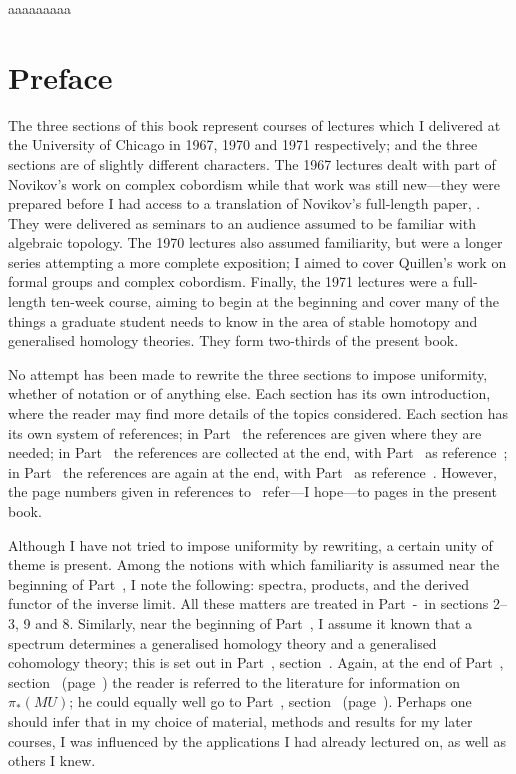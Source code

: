 \documentclass[main]{subfiles}
\begin{document}
 aaaaaaaaa

\chapter*{Preface}
The three sections of this book represent courses of lectures which I delivered at the University of Chicago in 1967, 1970 and 1971 respectively; and the three sections are of slightly different characters.
The 1967 lectures dealt with part of Novikov's work on complex cobordism while that work was still new---they were prepared before I had access to a translation of Novikov's full-length paper, . 
They were delivered as seminars to an audience assumed to be familiar with algebraic topology. 
The 1970 lectures also assumed familiarity, but were a longer series attempting a more complete exposition; I aimed to cover Quillen's work on formal groups and complex cobordism.
Finally, the 1971 lectures were a full-length ten-week course, aiming to begin at the beginning and cover many of the things a graduate student needs to know in the area of stable homotopy and generalised homology theories.
They form two-thirds of the present book.

No attempt has been made to rewrite the three sections to impose uniformity, whether of notation or of anything else. 
Each section has its own introduction, where the reader may find more details of the topics considered. 
Each section has its own system of references; in Part~ the
references are given where they are needed; in Part~ the references are collected at the end, with Part~ as reference~\plscite{[2]}; in Part~ the references are again at the end, with Part~ as reference~. 
However, the page numbers given in references to~\plscite{[2]} refer---I hope---to pages in the present book.

Although I have not tried to impose uniformity by rewriting, a certain unity of theme is present. 
Among the notions with which familiarity is assumed near the beginning of Part~, I note the following: spectra, products, and the derived functor of the inverse limit. 
All these matters are treated in Part~-~in sections 2--3, 9 and 8. Similarly, near the beginning of Part~, I assume it known that a spectrum determines a generalised homology theory and a generalised cohomology theory; this is set out in Part~, section~. 
Again, at the end of Part~, section~ (page~) the reader is referred to the literature for information on $\pi_{*} (MU)$; he could equally well go to Part~, section~ (page~). Perhaps one should infer that in my choice of material, methods and results for my later courses, I was influenced by the applications I had already lectured on, as well as others I knew.
\end{document}
